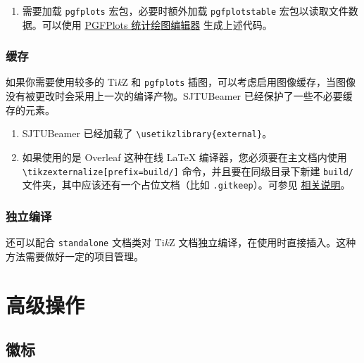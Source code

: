 \documentclass[
    UTF8,
    heading=true,
    12pt,
    a4paper
]{ctexrep}
\newenvironment{commentlist}
{\begin{enumerate}\small}
{\end{enumerate}}
\newcommand{\cls}[1]{\texttt{#1}}
\newcommand{\pkg}[1]{\texttt{#1}}
\def\themename{\textsf{SJTUBeamer}}
\begin{document}

\begin{commentlist}
  \item 需要加载 \pkg{pgfplots} 宏包，必要时额外加载
  \pkg{pgfplotstable} 宏包以读取文件数据。可以使用
  \href{https://logcreative.github.io/PGFPlotsEdt/}{PGFPlots 统计绘图编辑器}
  生成上述代码。
\end{commentlist}

\section{缓存}

如果你需要使用较多的 Ti\emph{k}Z 和 \pkg{pgfplots}
插图，可以考虑启用图像缓存，当图像没有被更改时会采用上一次的编译产物。\themename{}
已经保护了一些不必要缓存的元素。


\begin{commentlist}
  \item \themename{} 已经加载了
  \verb"\usetikzlibrary{external}"。
  \item[\faExclamationTriangle] 如果使用的是 Overleaf
  这种在线 \LaTeX{} 编译器，您必须要在主文档内使用
  \verb"\tikzexternalize[prefix=build/]" 命令，并且要在同级目录下新建
  \verb"build/" 文件夹，其中应该还有一个占位文档（比如
  \verb".gitkeep"）。可参见
  \href{https://www.overleaf.com/learn/latex/Questions/I_have_a_lot_of_tikz%2C_matlab2tikz_or_pgfplots_figures%2C_so_I%27m_getting_a_compilation_timeout._Can_I_externalise_my_figures%3F}{相关说明}。
\end{commentlist}

\section{独立编译}

还可以配合 \cls{standalone} 文档类对 Ti\emph{k}Z
文档独立编译，在使用时直接插入。这种方法需要做好一定的项目管理。


\part{高级操作}
\chapter{徽标}
\end{document}
